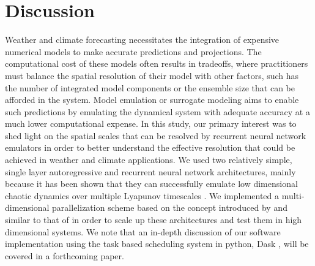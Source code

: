 \section{Discussion}
\label{sec:discussion}

Weather and climate forecasting necessitates the integration of expensive
numerical models to make accurate predictions and projections.
The computational cost of these models often results in tradeoffs, where
practitioners must balance the spatial resolution of their model with other
factors, such has the number of integrated model components or the ensemble
size that can be afforded in the system.
Model emulation or surrogate modeling aims to enable such predictions
by emulating the dynamical system with adequate accuracy at a much lower
computational expense.
In this study, our primary interest was to shed light on the spatial scales
that can be resolved by recurrent neural network emulators in order to better
understand the effective resolution that could be achieved in weather and
climate applications.
We used two relatively simple, single layer autoregressive and recurrent neural
network architectures, mainly because it has been shown that they can
successfully emulate low dimensional chaotic dynamics over multiple Lyapunov
timescales
\citep{pathak_using_2017,vlachas_backpropagation_2020,gauthier_next_2021,platt_systematic_2022}.
We implemented a multi-dimensional parallelization scheme based on the concept
introduced by \citet{pathak_model-free_2018} and similar to that of
\citet{arcomano_machine_2020}
in order to scale up these architectures and test them in high dimensional
systems.
We note that an in-depth discussion of our software implementation using the
task based scheduling system in python, Dask \citep{dask_2016}, will be covered in a
forthcoming paper.

